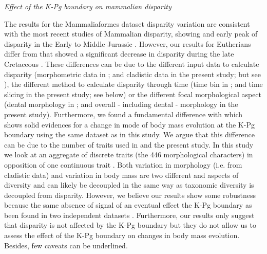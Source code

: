 \documentclass[12pt,letterpaper]{article}
\renewcommand{\subsection}[1]{%
\bigskip
\begin{center}
\begin{large}
\normalfont\itshape #1
\end{large}
\end{center}}
\begin{document}
\subsection{Effect of the K-Pg boundary on mammalian disparity}
The results for the Mammaliaformes dataset disparity variation are consistent with the most recent studies of Mammalian disparity, showing and early peak of disparity in the Early to Middle Jurassic \citep{Close2015}.
However, our results for Eutherians differ from \cite{Grossnickle2013} that showed a significant decrease in disparity during the late Cretaceous \citep[but see][]{Wilson2012}.
These differences can be due to the different input data to calculate disparity (morphometric data in \citealt{Grossnickle2013}; and cladistic data in the present study; but see \citealt{foth2012different,hetherington2015cladistic}), the different method to calculate disparity through time (time bin in \citealt{Grossnickle2013}; and time slicing in the present study; see below) or the different focal morphological aspect (dental morphology in \citealt{Grossnickle2013}; and overall - including dental - morphology in the present study).
Furthermore, we found a fundamental difference with \cite{Slater2012MEE} which shows solid evidences for a change in mode of body mass evolution at the K-Pg boundary using the same dataset as in this study.
We argue that this difference can be due to the number of traits used in \cite{Slater2012MEE} and the present study.
In this study we look at an aggregate of discrete traits (the 446 morphological characters) in opposition of one continuous trait \citep[body mass in][]{Slater2012MEE}.
Both variation in morphology (i.e. from cladistic data) and variation in body mass are two different and aspects of diversity and can likely be decoupled in the same way as taxonomic diversity is decoupled from disparity. 
However, we believe our results show some robustness because the same absence of signal of an eventual effect the K-Pg boundary as been found in two independent datasets \citep[i.e.][]{Slater2012MEE,beckancient2014}.
Furthermore, our results only suggest that disparity is not affected by the K-Pg boundary but they do not allow us to assess the effect of the K-Pg boundary on changes in body mass evolution. %
Besides, few caveats can be underlined.  %
\end{document}
